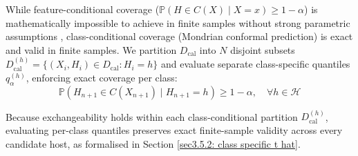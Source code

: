 While feature-conditional coverage ($\mathbb{P}(H \in C(X) \mid X = x) \ge 1 - \alpha$) is mathematically 
impossible to achieve in finite samples without strong parametric assumptions \cite{vovk2005algorithmic,ochoarivera2024conformal}, 
class-conditional coverage (Mondrian conformal prediction) is exact and valid in finite 
samples. We partition $D_{\text{cal}}$ into $N$ disjoint subsets $D_{\text{cal}}^{(h)} = \{(X_i, H_i) \in D_{\text{cal}} 
: H_i = h\}$ and evaluate separate class-specific quantiles $q_{\alpha}^{(h)}$, enforcing exact coverage per class:
\begin{equation}
\mathbb{P}\left(H_{n+1} \in C(X_{n+1}) \;\Big|\; H_{n+1} = h\right) \ge 1 - \alpha, \quad \forall h \in \mathcal{H}
\end{equation}

Because exchangeability holds within each class-conditional partition $D_{\text{cal}}^{(h)}$, evaluating 
per-class quantiles preserves exact finite-sample validity across every candidate host, as formalised in 
Section \ref{sec3.5.2: class specific t hat}.










